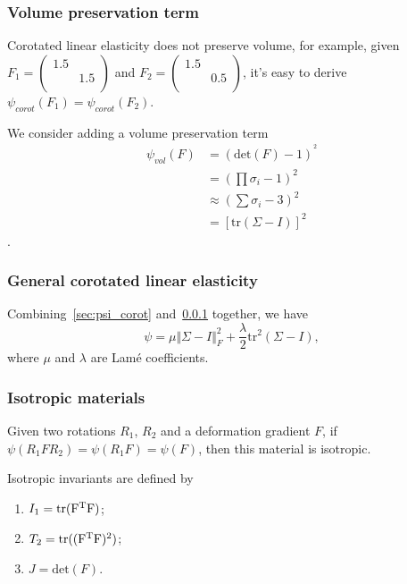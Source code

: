 \documentclass{fancydoc}
\newcommand{\trans}{\mathrm{T}}
\newcommand{\tr}{\rm tr}
\begin{document}
\subsubsection{Volume preservation term}\label{sec:psi_vol}
Corotated linear elasticity does not preserve volume, for example, given $F_1 = \begin{pmatrix}
1.5 & \\ 
 & 1.5 \\
\end{pmatrix}$ and $F_2 = \begin{pmatrix}
1.5 & \\
 & 0.5 \\
\end{pmatrix}$, it's easy to derive $\psi_{corot}(F_1) = \psi_{corot}(F_2)$.

We consider adding a volume preservation term
\begin{subequations}
\begin{align}
\psi_{vol}(F) &= (\mathrm{det}(F) - 1)^^2 \\
              &= (\prod \sigma_i - 1)^2	 \\
              &\approx (\sum \sigma_i - 3)^2 \\
              &=[\mathrm{tr}(\Sigma - I)]^2
\end{align}
\end{subequations}.

\subsubsection{General corotated linear elasticity}
Combining~\ref{sec:psi_corot} and~\ref{sec:psi_vol} together, we have
\begin{equation}
\psi = \mu \Vert \Sigma - I\Vert^2_F + \frac{\lambda}{2} \mathrm{tr}^2(\Sigma - I),
\end{equation}
where $\mu$ and $\lambda$ are Lamé coefficients.


\subsubsection{Isotropic materials}
Given two rotations $R_1$, $R_2$ and a deformation gradient $F$, if $\psi(R_1 F R_2) = \psi(R_1 F) = \psi(F)$, then this material is isotropic.

Isotropic invariants are defined by
\begin{enumerate}
    \item $I_1 = \tr (F^\trans F)$;
    \item  $T_2 = \tr ((F^\trans F)^2)$;
    \item  $J = \mathrm{det}(F)$.
\end{enumerate}
\end{document}
